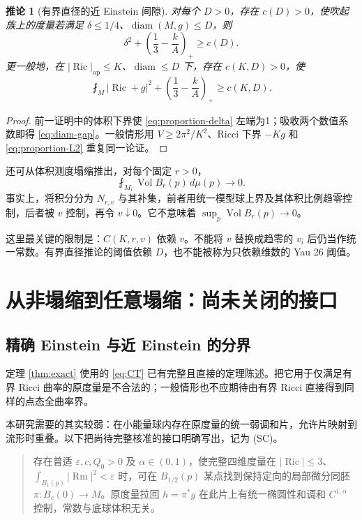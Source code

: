 \documentclass[UTF8,fontset=fandol,zihao=-4]{ctexart}
\theoremstyle{cn}
\newtheorem{corollary}[theorem]{推论}
\DeclareMathOperator{\Ric}{Ric}
\DeclareMathOperator{\Rm}{Rm}
\DeclareMathOperator{\Vol}{Vol}
\DeclareMathOperator{\diam}{diam}
\newcommand{\op}{\mathrm{op}}
\newcommand{\dd}{\,d\mu}
\newcommand{\av}{\fint}
\numberwithin{equation}{section}
\begin{document}
\begin{corollary}[有界直径的近 Einstein 间隙]\label{cor:diam}
对每个 $D>0$，存在 $c(D)>0$，使吹起族上的度量若满足 $\delta\le1/4$、$\diam(M,g)\le D$，则
\begin{equation}\label{eq:diam-gap}
\delta^2+\left(\frac13-\frac{k}{A}\right)_+\ge c(D).
\end{equation}
更一般地，在 $|\Ric|_{\op}\le K$、$\diam\le D$ 下，存在 $c(K,D)>0$，使
\begin{equation}\label{eq:diam-L2}
\av_M|\Ric+g|^2+\left(\frac13-\frac{k}{A}\right)_+\ge c(K,D).
\end{equation}
\end{corollary}
\begin{proof}
前一证明中的体积下界使 \eqref{eq:proportion-delta} 左端为1；吸收两个数值系数即得 \eqref{eq:diam-gap}。一般情形用 $V\ge2\pi^2/K^2$、Ricci 下界 $-Kg$ 和 \eqref{eq:proportion-L2} 重复同一论证。
\end{proof}

还可从体积测度塌缩推出，对每个固定 $r>0$，
\begin{equation}\label{eq:mean-ball}
\av_{M_i}\Vol B_r(p)\dd(p)\longrightarrow0.
\end{equation}
事实上，将积分分为 $N_{r,v}$ 与其补集，前者用统一模型球上界及其体积比例趋零控制，后者被 $v$ 控制，再令 $v\downarrow0$。它不意味着 $\sup_p\Vol B_r(p)\to0$。

这里最关键的限制是：$C(K,r,v)$ 依赖 $v$。不能将 $v$ 替换成趋零的 $v_i$ 后仍当作统一常数。有界直径推论的阈值依赖 $D$，也不能被称为只依赖维数的 Yau 26 阈值。

\section{从非塌缩到任意塌缩：尚未关闭的接口}

\subsection{精确 Einstein 与近 Einstein 的分界}

定理 \ref{thm:exact} 使用的 \eqref{eq:CT} 已有完整且直接的定理陈述。把它用于仅满足有界 Ricci 曲率的原度量是不合法的；一般情形也不应期待由有界 Ricci 直接得到同样的点态全曲率界。

本研究需要的其实较弱：在小能量球内存在原度量的统一弱调和片，允许片映射到流形时重叠。以下把尚待完整核准的接口明确写出，记为 (SC)。

\begin{quote}
存在普适 $\varepsilon,c,Q_0>0$ 及 $\alpha\in(0,1)$，使完整四维度量在 $|\Ric|\le3$、$\int_{B_1(p)}|\Rm|^2<\varepsilon$ 时，可在 $B_{1/2}(p)$ 某点找到保持定向的局部微分同胚 $\pi:B_c(0)\to M$。原度量拉回 $h=\pi^*g$ 在此片上有统一椭圆性和调和 $C^{1,\alpha}$ 控制，常数与底球体积无关。
\end{quote}
\end{document}
